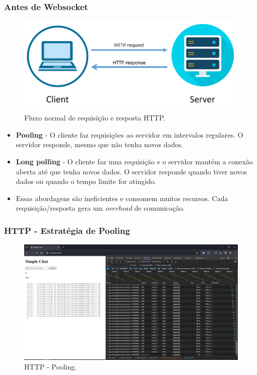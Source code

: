 \documentclass[
	10pt, %
	t, %
]{beamer}
\begin{document}
\begin{frame}
	\frametitle{Antes de Websocket}

	\begin{figure}
		\centering
		\includegraphics[width=0.4\linewidth]{http_padrao.png}
		\caption{Fluxo normal de requisição e resposta HTTP.}
		\label{fig:http_padrao}
	\end{figure}

	\begin{itemize}
		\item \textbf{Pooling} - O cliente faz requisições ao servidor em intervalos regulares. O servidor responde, mesmo que não tenha novos dados.
		\item \textbf{Long polling} - O cliente faz uma requisição e o servidor mantém a conexão aberta até que tenha novos dados. O servidor responde quando tiver novos dados ou quando o tempo limite for atingido.
		\item \alert{Essas abordagens são ineficientes e consomem muitos recursos. Cada requisição/resposta gera um \textit{overhead} de comunicação.}
	\end{itemize}

\end{frame}

\begin{frame}
	\frametitle{HTTP - Estratégia de Pooling}

	\begin{figure}
		\centering
		\includegraphics[width=0.9\linewidth]{pooling.png}
		\caption{HTTP - Pooling.}
		\label{fig:http_pooling}
	\end{figure}
	
\end{frame}
\end{document}
